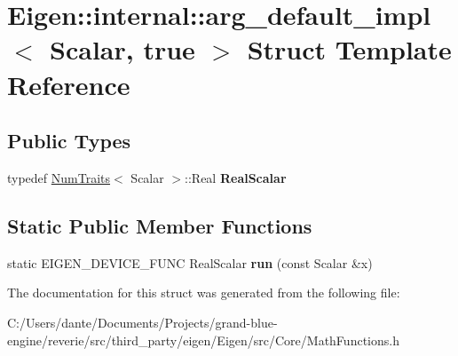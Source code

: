 \hypertarget{struct_eigen_1_1internal_1_1arg__default__impl_3_01_scalar_00_01true_01_4}{}\section{Eigen\+::internal\+::arg\+\_\+default\+\_\+impl$<$ Scalar, true $>$ Struct Template Reference}
\label{struct_eigen_1_1internal_1_1arg__default__impl_3_01_scalar_00_01true_01_4}
\subsection*{Public Types}
\begin{DoxyCompactItemize}
\item 
\mbox{\label{struct_eigen_1_1internal_1_1arg__default__impl_3_01_scalar_00_01true_01_4_ae8699a53f2b011d399e5cff9708e6137}} 
typedef \mbox{\hyperlink{struct_eigen_1_1_num_traits}{Num\+Traits}}$<$ Scalar $>$\+::Real {\bfseries Real\+Scalar}
\end{DoxyCompactItemize}
\subsection*{Static Public Member Functions}
\begin{DoxyCompactItemize}
\item 
\mbox{\label{struct_eigen_1_1internal_1_1arg__default__impl_3_01_scalar_00_01true_01_4_a64dcc220ce60a56680a4163665535f6b}} 
static E\+I\+G\+E\+N\+\_\+\+D\+E\+V\+I\+C\+E\+\_\+\+F\+U\+NC Real\+Scalar {\bfseries run} (const Scalar \&x)
\end{DoxyCompactItemize}


The documentation for this struct was generated from the following file\+:\begin{DoxyCompactItemize}
\item 
C\+:/\+Users/dante/\+Documents/\+Projects/grand-\/blue-\/engine/reverie/src/third\+\_\+party/eigen/\+Eigen/src/\+Core/Math\+Functions.\+h\end{DoxyCompactItemize}

